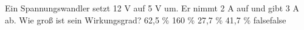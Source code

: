     {Ein Spannungswandler setzt 12 V auf 5 V um. Er nimmt 2 A auf und gibt 3 A ab. Wie groß ist sein Wirkungsgrad?}
    {62,5 \%}
    {160 \%}
    {27,7 \%}
    {41,7 \%}
    {false}{false}